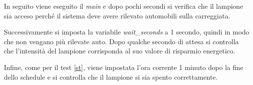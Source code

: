 In seguito viene eseguito il \textit{main} e dopo pochi secondi si verifica che il lampione sia acceso perché il sistema deve avere rilevato automobili sulla carreggiata.

Successivamente si imposta la variabile \textit{wait\_seconds} a 1 secondo, quindi in modo che non vengano più rilevate auto.
Dopo qualche secondo di attesa si controlla che l'intensità del lampione corrisponda al suo valore di risparmio energetico.

Infine, come per il test \ref{st}, viene impostata l'ora corrente 1 minuto dopo la fine dello schedule e si controlla che il lampione si sia spento correttamente.
